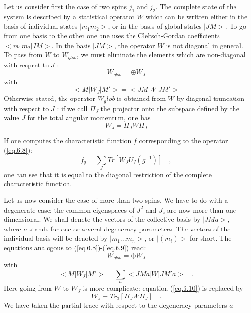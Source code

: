 \documentclass[a4paper,11pt]{article}
\begin{document}
Let us consider first the case of two spins $j_1$ and $j_2$. The complete state of the system 
is 
described by a statistical operator $W$ which can be written either in the basis of individual 
states $|m_1m_2>$, or in the basis of global states $|JM>$. To go from one basis to the other 
one 
one uses the Clebsch-Gordan coefficients $<m_1m_2|JM>$. In the basis $|JM>$, the operator $W$ 
is not diagonal in general. To pass from $W$ to $W_{glob}$, we must eliminate the elements 
which are non-diagonal with respect to $J$ :
\begin{equation}
 \label{eq.6.8}
    W_{glob} = \oplus W_J
\end{equation}
with
\begin{equation}
 \label{eq.6.9}
   <M | W_J | M'> = <JM | W | JM'>
\end{equation}
Otherwise stated, the operator $W_glob$ is obtained from $W$ by diagonal truncation with 
respect to 
$J$ : if we call $\Pi_J$ the projector onto the subspace defined by the value $J$ for the total 
angular momentum, one has
\begin{equation}
 \label{eq.6.10}
    W_J = \Pi_J W \Pi_J
\end{equation}

If one computes the characteristic function $f$ corresponding to the operator (\ref{eq.6.8}):
\begin{equation}
 \label{eq.6.11}
   f_g = \sum_J Tr [W_J U_J(g^{-1}) ] \quad ,
\end{equation}
one can see that it is equal to the diagonal restriction of the complete characteristic function. 

Let us now consider the case of more than two spins. We have to do with a degenerate case: the 
common eigenspaces of $J^2$ and $J_z$ are now more than one-dimensional. We shall denote the 
vectors 
of the collective basis by $|JMa>$, where $a$ stands for one or several degeneracy parameters. 
The vectors of the individual basis will be denoted by $|m_1...m_n>$, or $|(m_i)>$ for short. 
The equations analogous to (\ref{eq.6.8})-(\ref{eq.6.9}) read:
\begin{equation}
 \label{eq.6.12}
    W_{glob} = \oplus W_J
\end{equation}
with
\begin{equation}
 \label{eq.6.13}
   <M | W_J | M'> = \sum_a <JMa | W | JM'a>  \quad .
\end{equation}
Here going from $W$ to $W_J$ is more complicate: equation (\ref{eq.6.10}) is replaced by
\begin{equation}
 \label{eq.6.14}
    W_J = Tr_a [\Pi_J W \Pi_J]  \quad .
\end{equation}
We have taken the partial trace with respect to the degeneracy parameters $a$.
\end{document}
